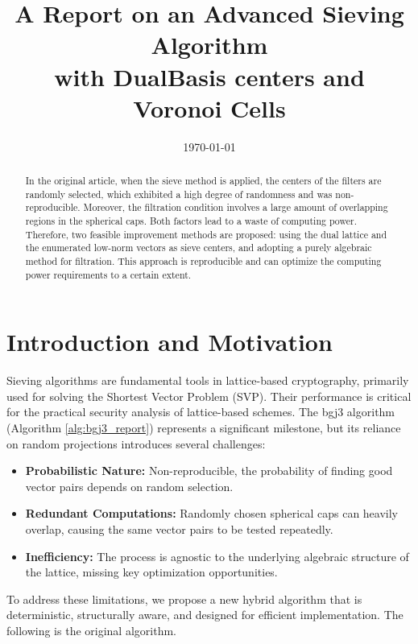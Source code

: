 \documentclass{article}
\title{\textbf{A Report on an Advanced Sieving Algorithm \\ with DualBasis centers and Voronoi Cells}}
\date{\today}
\begin{document}
\maketitle

\begin{abstract}
In the original article, when the sieve method is applied, the centers of the filters are randomly selected, which exhibited a high 
degree of randomness and was non-reproducible. Moreover, the filtration condition involves a large amount of overlapping regions in the 
spherical caps. Both factors lead to a waste of computing power. Therefore, two feasible improvement methods are proposed: using the 
dual lattice and the enumerated low-norm vectors as sieve centers, and adopting a purely algebraic method for filtration. This approach 
is reproducible and can optimize the computing power requirements to a certain extent.
\end{abstract}

\section{Introduction and Motivation}

Sieving algorithms are fundamental tools in lattice-based cryptography, primarily used for solving the Shortest Vector Problem (SVP). Their performance is critical for the practical security analysis of lattice-based schemes. The bgj3 algorithm (Algorithm \ref{alg:bgj3_report}) represents a significant milestone, but its reliance on random projections introduces several challenges:

\begin{itemize}
    \item \textbf{Probabilistic Nature:} Non-reproducible, the probability of finding good vector pairs depends on random selection.
    \item \textbf{Redundant Computations:} Randomly chosen spherical caps can heavily overlap, causing the same vector pairs to be tested repeatedly.
    \item \textbf{Inefficiency:} The process is agnostic to the underlying algebraic structure of the lattice, missing key optimization opportunities.
\end{itemize}

To address these limitations, we propose a new hybrid algorithm that is deterministic, structurally aware, and designed for efficient 
implementation. The following is the original algorithm.
\end{document}
